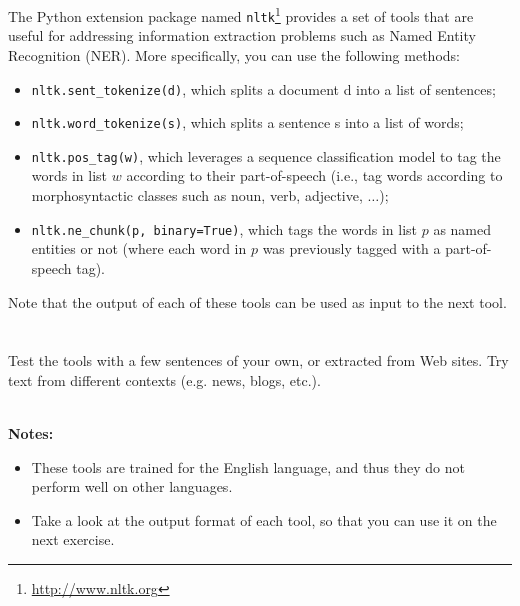 \documentclass[12pt]{article}
\begin{document}

The Python extension package named \verb+nltk+\footnote{\url{http://www.nltk.org}} provides a set of tools that are useful for addressing information extraction problems such as Named Entity Recognition (NER). More specifically, you can use the following methods:

\begin{itemize}
\item \verb+nltk.sent_tokenize(d)+, which splits a document d into a list of sentences;

\item \verb+nltk.word_tokenize(s)+, which splits a sentence s into a list of words;

\item \verb+nltk.pos_tag(w)+, which leverages a sequence classification model to tag the words in list $w$ according to their part-of-speech (i.e., tag words according to morphosyntactic classes such as noun, verb, adjective, $\ldots$);

\item \verb+nltk.ne_chunk(p, binary=True)+, which tags the words in list $p$ as named entities or not (where each word in $p$ was previously tagged with a part-of-speech tag).
\end{itemize}

Note that the output of each of these tools can be used as input to the next tool.

\section{}

Test the tools with a few sentences of your own, or extracted from Web sites. Try text from different contexts (e.g. news, blogs, etc.).

~\\
{\bf Notes:}

\begin{itemize}
\item These tools are trained for the English language, and thus they do not perform well on other languages.
\item Take a look at the output format of each tool, so that you can use it on the next exercise.
\end{itemize}
\end{document}
